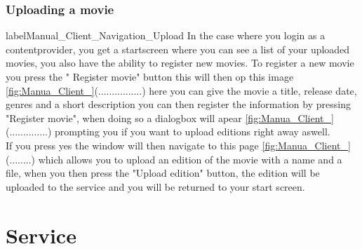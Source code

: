 \subsubsection{Uploading a movie}
label{Manual_Client_Navigation_Upload}
In the case where you login as a contentprovider, you get a startscreen where you can see a list of your uploaded movies, you also have the ability to register new movies. To register a new movie you press the " Register movie" button this will then op this image \ref{fig:Manua_Client_}(................) here you can give the movie a title,  release date, genres and a short description you can then register the information by pressing "Register movie", when doing so a dialogbox will apear \ref{fig:Manua_Client_}(..............) prompting you if you want to upload editions right away aswell.
\\If you press yes the window will then navigate to this page \ref{fig:Manua_Client_}(........) which allows you to upload an edition of the movie with a name and a file, when you then press the "Upload edition" button, the edition will be uploaded to the service and you will be returned to your start screen.

\section{Service}
\label{Manual_Service}